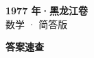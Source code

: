 \documentclass[zihao=-4, a4paper]{ctexart}
\begin{document}
\begin{center}
  {\Large\bfseries 1977 年·黑龙江卷}\\[4pt]
  {\large 数学 · 简答版}
\end{center}
\medskip
{}

\clearpage
{}
\begin{center}{\Large\bfseries 答案速查}\end{center}
\medskip

\end{document}
